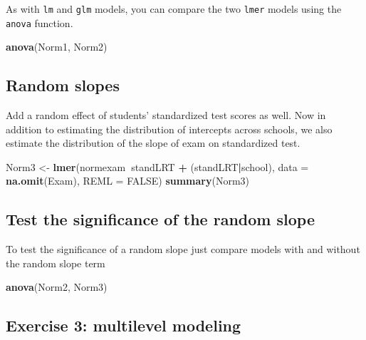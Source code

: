 \documentclass[]{book}
\newenvironment{Shaded}{\begin{snugshade}}{\end{snugshade}}
\newcommand{\KeywordTok}[1]{\textcolor[rgb]{0.13,0.29,0.53}{\textbf{#1}}}
\newcommand{\DataTypeTok}[1]{\textcolor[rgb]{0.13,0.29,0.53}{#1}}
\newcommand{\StringTok}[1]{\textcolor[rgb]{0.31,0.60,0.02}{#1}}
\newcommand{\OtherTok}[1]{\textcolor[rgb]{0.56,0.35,0.01}{#1}}
\newcommand{\OperatorTok}[1]{\textcolor[rgb]{0.81,0.36,0.00}{\textbf{#1}}}
\newcommand{\NormalTok}[1]{#1}
\begin{document}
As with \texttt{lm} and \texttt{glm} models, you can compare the two
\texttt{lmer} models using the \texttt{anova} function.

\begin{Shaded}
\begin{Highlighting}[]
  \KeywordTok{anova}\NormalTok{(Norm1, Norm2)}
\end{Highlighting}
\end{Shaded}

\subsection{Random slopes}\label{random-slopes}

Add a random effect of students' standardized test scores as well. Now
in addition to estimating the distribution of intercepts across schools,
we also estimate the distribution of the slope of exam on standardized
test.

\begin{Shaded}
\begin{Highlighting}[]
\NormalTok{  Norm3 <-}\StringTok{ }\KeywordTok{lmer}\NormalTok{(normexam}\OperatorTok{~}\NormalTok{standLRT }\OperatorTok{+}\StringTok{ }\NormalTok{(standLRT}\OperatorTok{|}\NormalTok{school), }
                \DataTypeTok{data =} \KeywordTok{na.omit}\NormalTok{(Exam),}
                \DataTypeTok{REML =} \OtherTok{FALSE}\NormalTok{) }
  \KeywordTok{summary}\NormalTok{(Norm3) }
\end{Highlighting}
\end{Shaded}

\subsection{Test the significance of the random
slope}\label{test-the-significance-of-the-random-slope}

To test the significance of a random slope just compare models with and
without the random slope term

\begin{Shaded}
\begin{Highlighting}[]
  \KeywordTok{anova}\NormalTok{(Norm2, Norm3) }
\end{Highlighting}
\end{Shaded}

\subsection{Exercise 3: multilevel
modeling}\label{exercise-3-multilevel-modeling}
\end{document}
